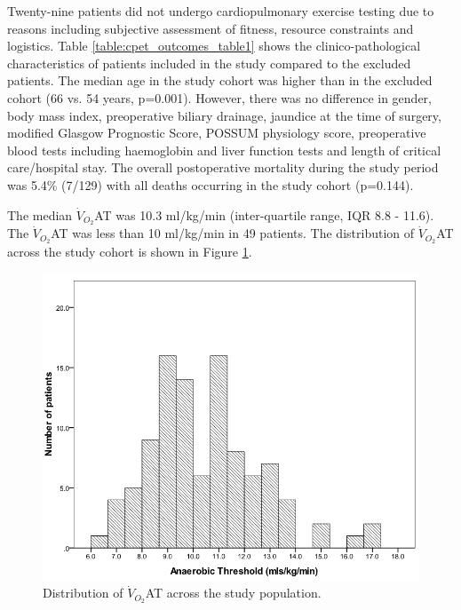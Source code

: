 Twenty-nine patients did not undergo cardiopulmonary exercise testing due to reasons including subjective assessment of fitness, resource constraints and logistics. 
Table \ref{table:cpet_outcomes_table1} shows the clinico-pathological characteristics of patients included in the study compared to the excluded patients. 
The median age in the study cohort was higher than in the excluded cohort (66 vs. 54 years, p=0.001). 
However, there was no difference in gender, body mass index, preoperative biliary drainage, jaundice at the time of surgery, modified Glasgow Prognostic Score, POSSUM physiology score, preoperative blood tests including haemoglobin and liver function tests and length of critical care/hospital stay. 
The overall postoperative mortality during the study period was 5.4\% (7/129) with all deaths occurring in the study cohort (p=0.144).



The median $\dot{V}_{O_2}$AT was 10.3 ml/kg/min (inter-quartile range, IQR 8.8 - 11.6). 
The $\dot{V}_{O_2}$AT was less than 10 ml/kg/min in 49 patients. 
The distribution of $\dot{V}_{O_2}$AT across the study cohort is shown in Figure \ref{fig:cpet_outcomes_dist_of_AT}.

\begin{figure}[p]
	\centering
	\includegraphics[width=\textwidth]{Figures/cpet_outcomes_dist_of_AT}
	\caption{Distribution of $\dot{V}_{O_2}$AT across the study population.}
	\label{fig:cpet_outcomes_dist_of_AT}
\end{figure}

